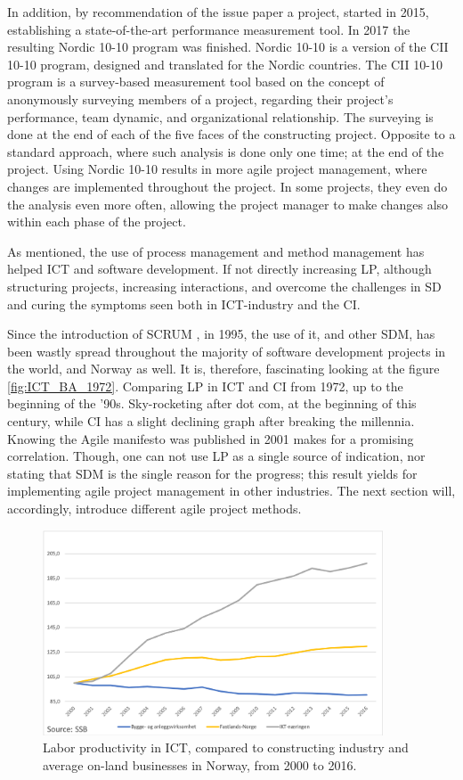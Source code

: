 In addition, by recommendation of the issue paper a project, started in 2015, establishing a state-of-the-art performance measurement tool. In 2017 the resulting Nordic 10-10 \cite{nordic-10-10} program was finished. Nordic 10-10 is a version of the CII 10-10 program\cite{CII-10-10}, designed and translated for the Nordic countries. The CII 10-10 program is a survey-based measurement tool based on the concept of anonymously surveying members of a project, regarding their project's performance, team dynamic, and organizational relationship. The surveying is done at the end of each of the five faces of the constructing project. Opposite to a standard approach, where such analysis is done only one time; at the end of the project. Using Nordic 10-10 results in more agile project management, where changes are implemented throughout the project. In some projects, they even do the analysis even more often, allowing the project manager to make changes also within each phase of the project. 

As mentioned, the use of process management and method management has helped ICT and software development. If not directly increasing LP, although structuring projects, increasing interactions, and overcome the challenges in SD and curing the symptoms seen both in ICT-industry and the CI.  

Since the introduction of SCRUM \cite{sutherland}, in 1995, the use of it, and other SDM, has been wastly spread throughout the majority of software development projects in the world, and Norway as well. It is, therefore, fascinating looking at the figure \ref{fig:ICT_BA_1972}. Comparing LP in ICT and CI from 1972, up to the beginning of the '90s. Sky-rocketing after dot com, at the beginning of this century, while CI has a slight declining graph after breaking the millennia. Knowing the Agile manifesto was published in 2001 makes for a promising correlation. Though, one can not use LP as a single source of indication, nor stating that SDM is the single reason for the progress; this result yields for implementing agile project management in other industries. The next section will, accordingly, introduce different agile project methods.

\begin{figure}
    \centering
    \includegraphics[width=0.9\textwidth]{fig/ba_on-land_ICT.png}
    \caption{Labor productivity in ICT, compared to constructing industry and average on-land businesses in Norway, from 2000 to 2016.}
    \label{fig:LP_ICT_VS}
\end{figure}

